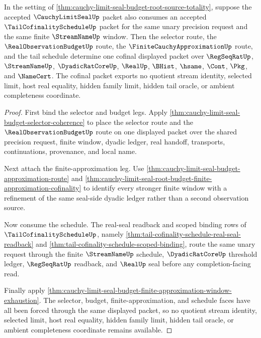 \begin{theorem}
\label{thm:cauchy-limit-seal-tail-schedule-budget-cofinality}
In the setting of \autoref{thm:cauchy-limit-seal-budget-root-source-totality}, suppose the accepted $\CauchyLimitSealUp$ packet also consumes an accepted $\TailCofinalityScheduleUp$ packet for the same unary precision request and the same finite $\StreamNameUp$ window. Then the selector route, the $\RealObservationBudgetUp$ route, the $\FiniteCauchyApproximationUp$ route, and the tail schedule determine one cofinal displayed packet over $\RegSeqRatUp$, $\StreamNameUp$, $\DyadicRatCoreUp$, $\RealUp$, $\BHist$, $\hsame$, $\Cont$, $\Pkg$, and $\NameCert$. The cofinal packet exports no quotient stream identity, selected limit, host real equality, hidden family limit, hidden tail oracle, or ambient completeness coordinate.
\end{theorem}
\begin{proof}
First bind the selector and budget legs. Apply \autoref{thm:cauchy-limit-seal-budget-selector-coherence} to place the selector route and the $\RealObservationBudgetUp$ route on one displayed packet over the shared precision request, finite window, dyadic ledger, real handoff, transports, continuations, provenance, and local name.

Next attach the finite-approximation leg. Use \autoref{thm:cauchy-limit-seal-budget-approximation-route} and \autoref{thm:cauchy-limit-seal-root-budget-finite-approximation-cofinality} to identify every stronger finite window with a refinement of the same seal-side dyadic ledger rather than a second observation source.

Now consume the schedule. The real-seal readback and scoped binding rows of $\TailCofinalityScheduleUp$, namely \autoref{thm:tail-cofinality-schedule-real-seal-readback} and \autoref{thm:tail-cofinality-schedule-scoped-binding}, route the same unary request through the finite $\StreamNameUp$ schedule, $\DyadicRatCoreUp$ threshold ledger, $\RegSeqRatUp$ readback, and $\RealUp$ seal before any completion-facing read.

Finally apply \autoref{thm:cauchy-limit-seal-budget-finite-approximation-window-exhaustion}. The selector, budget, finite-approximation, and schedule faces have all been forced through the same displayed packet, so no quotient stream identity, selected limit, host real equality, hidden family limit, hidden tail oracle, or ambient completeness coordinate remains available.
\end{proof}

